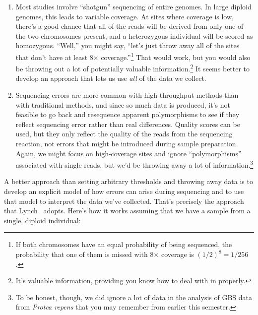 \documentclass[12pt]{article}
\begin{document}
\begin{enumerate}

\item Most studies involve ``shotgun'' sequencing of entire
  genomes. In large diploid genomes, this leads to variable
  coverage. At sites where coverage is low, there's a good chance that
  all of the reads will be derived from only one of the two
  chromosomes present, and a heterozygous individual will be scored as
  homozygous. ``Well,'' you might say, ``let's just throw away all of
  the sites that don't have at least 8$\times$ coverage.''\footnote{If
    both chromosomes have an equal probability of being sequenced, the
    probability that one of them is missed with 8$\times$ coverage is
    $(1/2)^8 = 1/256$.} That would work, but you would also be
  throwing out a lot of potentially valuable information.\footnote{It's
    valuable information, providing you know how to deal with in
    properly.} It seems better to develop an approach that lets us use
  {\it all\/} of the data we collect.

\item Sequencing errors are more common with high-throughput methods
  than with traditional methods, and since so much data is produced,
  it's not feasible to go back and resequence apparent polymorphisms
  to see if they reflect sequencing error rather than real
  differences. Quality scores can be used, but they only reflect the
  quality of the reads from the sequencing reaction, not errors that
  might be introduced during sample preparation. Again, we might focus
  on high-coverage sites and ignore ``polymorphisms'' associated with
  single reads, but we'd be throwing away a lot of
  information.\footnote{To be honest, though, we did ignore a lot of
    data in the analysis of GBS data from {\it Protea repens\/} that
    you may remember from earlier this semester.} 

\end{enumerate}
A better approach than setting arbitrary thresholds and throwing away
data is to develop an explicit model of how errors can arise during
sequencing and to use that model to interpret the data we've
collected. That's precisely the approach that Lynch~\cite{Lynch-2008}
adopts. Here's how it works assuming that we have a sample from a
single, diploid individual:
\end{document}
